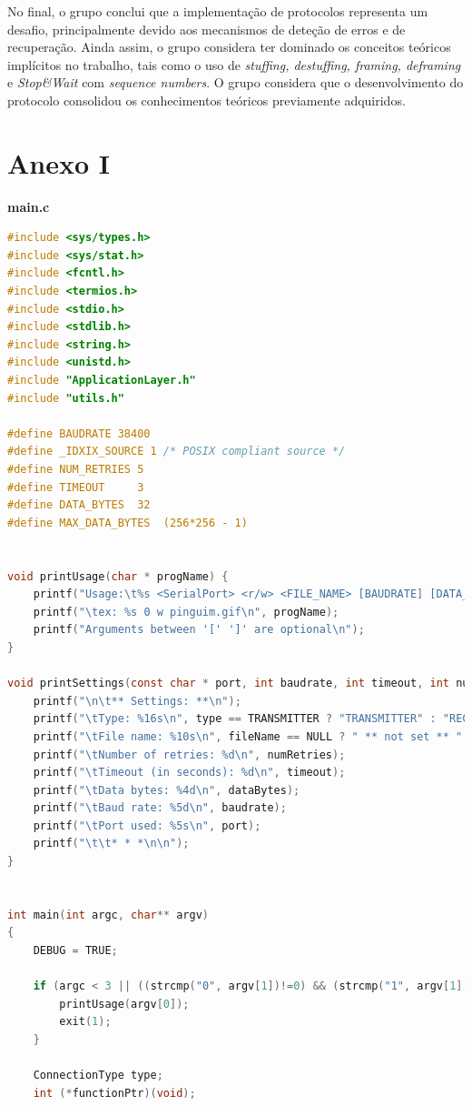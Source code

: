 \documentclass[a4paper, 11pt]{article}
\begin{document}
No final, o grupo conclui que a implementação de protocolos representa um desafio, principalmente devido aos mecanismos de deteção de erros e de recuperação. Ainda assim, o grupo considera ter dominado os conceitos teóricos implícitos no trabalho, tais como o uso de \textit{stuffing, destuffing, framing, deframing} e \textit{Stop\&Wait} com \textit{sequence numbers}. O grupo considera que o desenvolvimento do protocolo consolidou os conhecimentos teóricos previamente adquiridos.

\newpage

\section{Anexo I}

\huge\textbf{main.c}
\begin{lstlisting}[language=C]
#include <sys/types.h>
#include <sys/stat.h>
#include <fcntl.h>
#include <termios.h>
#include <stdio.h>
#include <stdlib.h>
#include <string.h>
#include <unistd.h>
#include "ApplicationLayer.h"
#include "utils.h"

#define BAUDRATE 38400
#define _IDXIX_SOURCE 1 /* POSIX compliant source */
#define NUM_RETRIES 5
#define TIMEOUT 	3
#define DATA_BYTES	32
#define MAX_DATA_BYTES	(256*256 - 1)


void printUsage(char * progName) {
	printf("Usage:\t%s <SerialPort> <r/w> <FILE_NAME> [BAUDRATE] [DATA_BYTES] [NUM_RETRIES] [TIMEOUT]\n", progName);
	printf("\tex: %s 0 w pinguim.gif\n", progName);
	printf("Arguments between '[' ']' are optional\n");
}

void printSettings(const char * port, int baudrate, int timeout, int numRetries, ConnectionType type, int dataBytes, const char * fileName) {
	printf("\n\t** Settings: **\n");
	printf("\tType: %16s\n", type == TRANSMITTER ? "TRANSMITTER" : "RECEIVER");
	printf("\tFile name: %10s\n", fileName == NULL ? " ** not set ** " : fileName);
	printf("\tNumber of retries: %d\n", numRetries);
	printf("\tTimeout (in seconds): %d\n", timeout);
	printf("\tData bytes: %4d\n", dataBytes);
	printf("\tBaud rate: %5d\n", baudrate);
	printf("\tPort used: %5s\n", port);
	printf("\t\t* * *\n\n");
}


int main(int argc, char** argv)
{
	DEBUG = TRUE;

	if (argc < 3 || ((strcmp("0", argv[1])!=0) && (strcmp("1", argv[1])!=0))) {
		printUsage(argv[0]);
		exit(1);
	}

	ConnectionType type;
	int (*functionPtr)(void);


\end{lstlisting}
\end{document}
